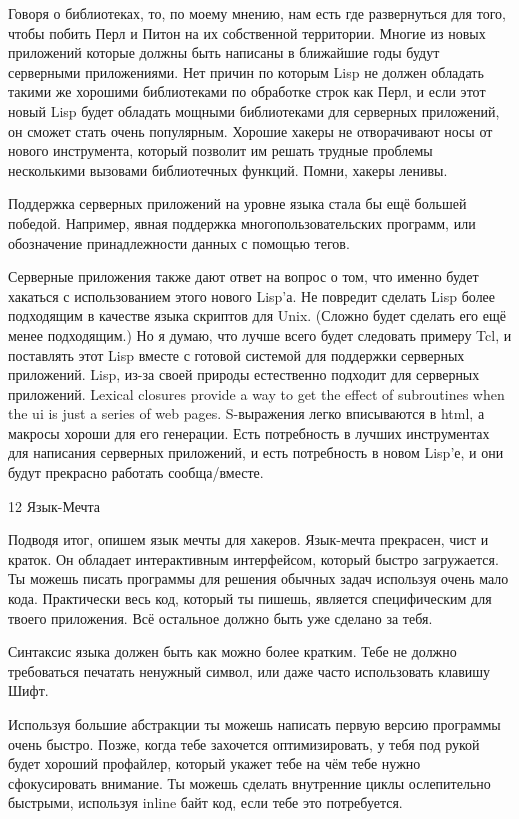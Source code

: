 \documentclass[ebook,12pt,oneside,openany]{memoir}
\begin{document}
Говоря о библиотеках, то, по моему мнению, нам есть где развернуться
для того, чтобы побить Перл и Питон на их собственной территории.
Многие из новых приложений которые должны быть написаны в ближайшие
годы будут серверными приложениями. Нет причин по которым Lisp не
должен обладать такими же хорошими библиотеками по обработке строк как
Перл, и если этот новый Lisp будет обладать мощными библиотеками для
серверных приложений, он сможет стать очень популярным. Хорошие хакеры
не отворачивают носы от нового инструмента, который позволит им решать
трудные проблемы несколькими вызовами библиотечных функций. Помни,
хакеры ленивы.

Поддержка серверных приложений на уровне языка стала бы ещё большей
победой. Например, явная поддержка многопользовательских программ, или
обозначение принадлежности данных с помощью тегов.

Серверные приложения также дают ответ на вопрос о том, что именно
будет хакаться с использованием этого нового Lisp'а. Не повредит
сделать Lisp более подходящим в качестве языка скриптов для Unix.
(Сложно будет сделать его ещё менее подходящим.) Но я думаю, что лучше
всего будет следовать примеру Tcl, и поставлять этот Lisp вместе с
готовой системой для поддержки серверных приложений. Lisp, из-за своей
природы естественно подходит для серверных приложений. Lexical
closures provide a way to get the effect of subroutines when the ui is
just a series of web pages. S-выражения легко вписываются в html, а
макросы хороши для его генерации. Есть потребность в лучших
инструментах для написания серверных приложений, и есть потребность в
новом Lisp'е, и они будут прекрасно работать сообща/вместе.

12 Язык-Мечта

Подводя итог, опишем язык мечты для хакеров. Язык-мечта прекрасен,
чист и краток. Он обладает интерактивным интерфейсом, который быстро
загружается. Ты можешь писать программы для решения обычных задач
используя очень мало кода. Практически весь код, который ты пишешь,
является специфическим для твоего приложения. Всё остальное должно
быть уже сделано за тебя.

Синтаксис языка должен быть как можно более кратким. Тебе не должно
требоваться печатать ненужный символ, или даже часто использовать
клавишу Шифт.

Используя большие абстракции ты можешь написать первую версию
программы очень быстро. Позже, когда тебе захочется оптимизировать, у
тебя под рукой будет хороший профайлер, который укажет тебе на чём
тебе нужно сфокусировать внимание. Ты можешь сделать внутренние циклы
ослепительно быстрыми, используя inline байт код, если тебе это
потребуется.
\end{document}
